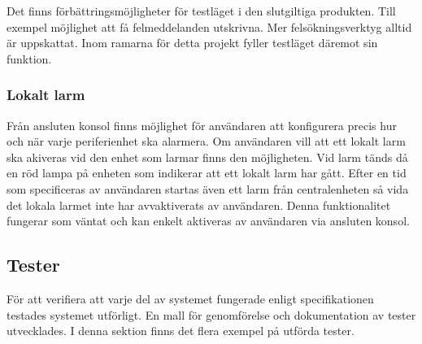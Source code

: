 \documentclass[a4paper]{article}
\begin{document}
Det finns förbättringsmöjligheter för testläget i den slutgiltiga produkten.
Till exempel möjlighet att få felmeddelanden utskrivna.
Mer felsökningsverktyg alltid är uppskattat.
Inom ramarna för detta projekt fyller testläget däremot sin funktion.

\subsubsection{Lokalt larm}
Från ansluten konsol finns möjlighet för användaren att konfigurera precis hur och när varje periferienhet ska alarmera.
Om användaren vill att ett lokalt larm ska akiveras vid den enhet som larmar finns den möjligheten.
Vid larm tänds då en röd lampa på enheten som indikerar att ett lokalt larm har gått.
Efter en tid som specificeras av användaren startas även ett larm från centralenheten så vida det lokala larmet inte har avvaktiverats av användaren.
Denna funktionalitet fungerar som väntat och kan enkelt aktiveras av användaren via ansluten konsol.

\subsection{Tester}
För att verifiera att varje del av systemet fungerade enligt specifikationen testades systemet utförligt.
En mall för genomförelse och dokumentation av tester utvecklades.
I denna sektion finns det flera exempel på utförda tester.

\end{document}
